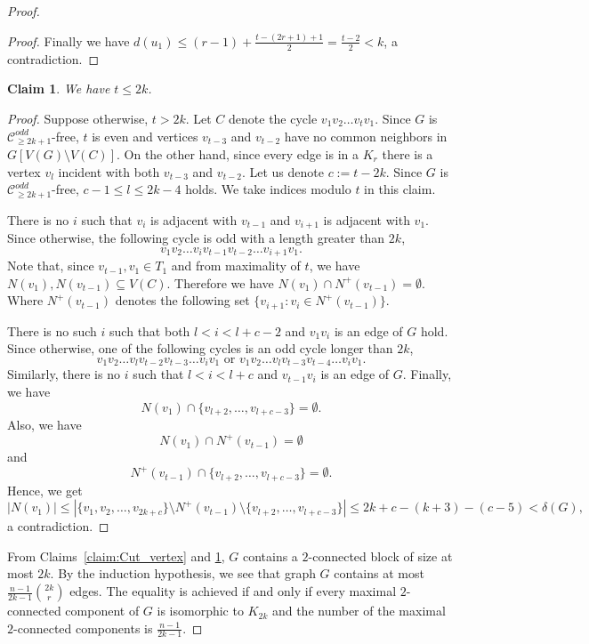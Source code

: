 \documentclass[a4paper,11pt]{article}
\newcommand{\abs}[1]{\left\vert{#1}\right\vert}
\newtheorem{claim}[theorem]{Claim}
\def\C{\mathcal C}
\begin{document}
\begin{proof}
\begin{proof}
Finally we have $d(u_1)\leq (r-1)+\frac{t-(2r+1)+1}{2}=\frac{t-2}{2}<k$, a contradiction. \end{proof}


\begin{claim}\label{claim:t<2k}
We have $t\leq 2k$.
\end{claim}

\begin{proof}
    Suppose otherwise, $t>2k$. Let $C$ denote  the cycle $v_1v_2\dots v_tv_1$.  Since $G$ is $\C^{odd}_{\geq 2k+1}$-free, $t$ is even and vertices $v_{t-3}$ and $v_{t-2}$ have no common neighbors in $G[V(G)\setminus V(C)]$. On the other hand, since every edge is in a $K_r$ there is a vertex $v_l$ incident with both $v_{t-3}$ and $v_{t-2}$.  Let us denote $c:=t-2k$. Since $G$ is $\C^{odd}_{\geq 2k+1}$-free, $c-1\leq l\leq 2k-4$ holds. We take indices modulo $t$ in this claim. 

    There is no $i$ such that $v_i$ is adjacent with $v_{t-1}$ and $v_{i+1}$ is adjacent with $v_{1}$. Since otherwise, the following cycle is odd with a length greater than $2k$,
    \[
        v_1v_2\dots v_iv_{t-1}v_{t-2} \dots v_{i+1}v_{1}.
    \]
    Note that, since $v_{t-1},v_1 \in T_1$ and from maximality of $t$, we have $N(v_1),N(v_{t-1})\subseteq V(C)$. Therefore we have $N(v_1)\cap N^+(v_{t-1})=\emptyset$. Where $N^+(v_{t-1})$ denotes the following set $\{v_{i+1}:v_i \in N^+(v_{t-1})\}$.

    There is no such $i$ such that both $l<i< l+c-2$ and $v_1v_i$ is an edge of $G$ hold. Since otherwise, one of the following cycles is an odd cycle longer than $2k$,
    \[
v_1v_2\dots v_l v_{t-2}v_{t-3}\dots v_{i}v_1 \mbox{~or~}
v_1v_2\dots v_l v_{t-3}v_{t-4}\dots v_{i}v_1.
    \]
 Similarly, there is no $i$ such that $l<i<l+c$ and $v_{t-1}v_i$ is an edge of $G$. Finally, we have 
 \[
N(v_1)\cap \{v_{l+2},\dots,v_{l+c-3}\}=\emptyset.
 \]
 Also, we have
  \[
N(v_1)\cap N^+(v_{t-1})=\emptyset
 \]
 and 
 \[
N^+(v_{t-1})\cap \{v_{l+2},\dots,v_{l+c-3}\}=\emptyset.
 \]
 Hence, we get
\[
\abs{N(v_1)}\leq \abs{\{v_1,v_2,\dots,v_{2k+c}\}\setminus N^+(v_{t-1})\setminus  \{v_{l+2},\dots,v_{l+c-3}\}}\leq 2k+c-(k+3)-(c-5)<\delta(G),  
\]
a contradiction.
\end{proof}

From Claims~\ref{claim:Cut_vertex} and \ref{claim:t<2k}, $G$ contains a $2$-connected block of size at most $2k$. By the induction hypothesis,  we see that graph $G$ contains  at most $\frac{n-1}{2k-1}\binom{2k}{r}$ edges. The equality is achieved if and only if every maximal $2$-connected component of $G$ is isomorphic to $K_{2k}$ and the number of the maximal $2$-connected components is  $\frac{n-1}{2k-1}$. 
\end{proof}
\end{document}

